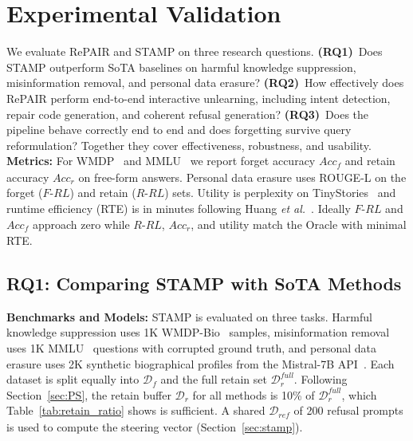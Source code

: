 \section{Experimental Validation}
We evaluate RePAIR and STAMP on three research questions. \textbf{(RQ1)}~Does STAMP outperform SoTA baselines on harmful knowledge suppression, misinformation removal, and personal data erasure? \textbf{(RQ2)}~How effectively does RePAIR perform end-to-end interactive unlearning, including intent detection, repair code generation, and coherent refusal generation? \textbf{(RQ3)}~Does the pipeline behave correctly end to end and does forgetting survive query reformulation? Together they cover effectiveness, robustness, and usability.\\
\textbf{Metrics:}
For WMDP~\cite{li2024wmdp} and MMLU~\cite{hendrycks2020measuring} we report forget accuracy $Acc_\textit{f}$ and retain accuracy $Acc_\textit{r}$ on free-form answers. Personal data erasure uses ROUGE-L on the forget ($F\text{-}RL$) and retain ($R\text{-}RL$) sets. Utility is perplexity on TinyStories~\cite{eldan2023tinystories} and runtime efficiency (RTE) is in minutes following Huang \textit{et al.}~\cite{huang2025unified}. Ideally $F\text{-}RL$ and $Acc_\textit{f}$ approach zero while $R\text{-}RL$, $Acc_\textit{r}$, and utility match the Oracle with minimal RTE.

\subsection{RQ1: Comparing STAMP with SoTA Methods}
\textbf{Benchmarks and Models:}
STAMP is evaluated on three tasks. Harmful knowledge suppression uses 1K WMDP-Bio~\cite{li2024wmdp} samples, misinformation removal uses 1K MMLU~\cite{hendrycks2020measuring} questions with corrupted ground truth, and personal data erasure uses 2K synthetic biographical profiles from the Mistral-7B API~\cite{Jiang2023Mistral7}. Each dataset is split equally into $\mathcal{D}_f$ and the full retain set $\mathcal{D}_r^{\textit{full}}$. Following Section~\ref{sec:PS}, the retain buffer $\mathcal{D}_r$ for all methods is 10\% of $\mathcal{D}_r^{\textit{full}}$, which Table~\ref{tab:retain_ratio} shows is sufficient. A shared $\mathcal{D}_{\textit{ref}}$ of 200 refusal prompts is used to compute the steering vector (Section~\ref{sec:stamp}).

